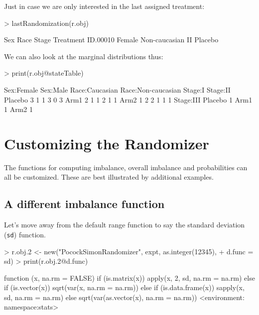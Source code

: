 \documentclass[11pt, letter]{article}
\numberwithin{equation}{section}
\begin{document}
Just in case we are only interested in the last assigned treatment:

\begin{Schunk}
\begin{Sinput}
> lastRandomization(r.obj)
\end{Sinput}
\begin{Soutput}
            Sex          Race Stage Treatment
ID.00010 Female Non-caucasian    II   Placebo
\end{Soutput}
\end{Schunk}

We can also look at the marginal distributions thus:

\begin{Schunk}
\begin{Sinput}
> print(r.obj@stateTable)
\end{Sinput}
\begin{Soutput}
        Sex:Female Sex:Male Race:Caucasian Race:Non-caucasian Stage:I Stage:II
Placebo          3        1              1                  3       0        3
Arm1             2        1              1                  2       1        1
Arm2             1        2              2                  1       1        1
        Stage:III
Placebo         1
Arm1            1
Arm2            1
\end{Soutput}
\end{Schunk}

\section{Customizing the Randomizer}
\label{sec:customization}

The functions for computing imbalance, overall imbalance and
probabilities can all be customized. These are best illustrated by
additional examples.

\subsection{A different imbalance function}
\label{sec:diff-imbalance}

Let's move away from the default range function to say the standard
deviation (\texttt{sd}) function.

\begin{Schunk}
\begin{Sinput}
> r.obj.2 <- new("PocockSimonRandomizer", expt, as.integer(12345), 
+     d.func = sd)
> print(r.obj.2@d.func)
\end{Sinput}
\begin{Soutput}
function (x, na.rm = FALSE) 
{
    if (is.matrix(x)) 
        apply(x, 2, sd, na.rm = na.rm)
    else if (is.vector(x)) 
        sqrt(var(x, na.rm = na.rm))
    else if (is.data.frame(x)) 
        sapply(x, sd, na.rm = na.rm)
    else sqrt(var(as.vector(x), na.rm = na.rm))
}
<environment: namespace:stats>
\end{Soutput}
\end{Schunk}
\end{document}
